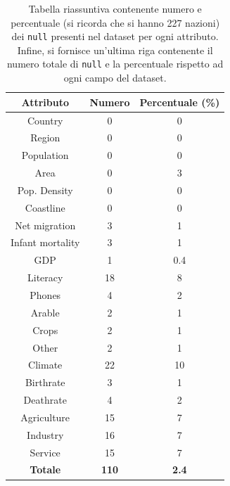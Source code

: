 \begin{table}
	\caption{Tabella riassuntiva contenente numero e percentuale (si ricorda che si hanno 227 nazioni) dei \texttt{null} presenti nel dataset per ogni attributo. Infine, si fornisce un'ultima riga contenente il numero totale di \texttt{null} e la percentuale rispetto ad ogni campo del dataset.}
	
	\label{tab:compl_country}
	
	\centering
	\begin{tabular}{|c|c|c|}
		\hline
		\textbf{Attributo}  & \textbf{Numero} & \textbf{Percentuale (\%)} \\ 
		\hline  
		\rule{0pt}{13pt}Country & 0 & 0 \\ 
		\hline  
		\rule{0pt}{13pt}Region & 0  & 0 \\ 
		\hline  
		\rule{0pt}{13pt}Population & 0 & 0 \\ 
		\hline  
		\rule{0pt}{13pt}Area & 0 & 3 \\ 
		\hline
		\rule{0pt}{13pt}Pop. Density & 0 & 0 \\
		\hline
		\rule{0pt}{13pt}Coastline & 0 & 0 \\
		\hline
		\rule{0pt}{13pt}Net migration & 3 & 1 \\
		\hline
		\rule{0pt}{13pt}Infant mortality & 3 & 1 \\
		\hline
		\rule{0pt}{13pt}GDP & 1 & 0.4 \\
		\hline
		\rule{0pt}{13pt}Literacy & 18 & 8 \\
		\hline
		\rule{0pt}{13pt}Phones & 4 & 2 \\
		\hline
		\rule{0pt}{13pt}Arable & 2 & 1 \\
		\hline
		\rule{0pt}{13pt}Crops & 2 & 1 \\
		\hline
		\rule{0pt}{13pt}Other & 2 & 1 \\
		\hline
		\rule{0pt}{13pt}Climate & 22 & 10 \\
		\hline
		\rule{0pt}{13pt}Birthrate & 3 & 1 \\
		\hline
		\rule{0pt}{13pt}Deathrate & 4 & 2 \\
		\hline
		\rule{0pt}{13pt}Agriculture & 15 & 7 \\
		\hline
		\rule{0pt}{13pt}Industry & 16 & 7 \\
		\hline
		\rule{0pt}{13pt}Service & 15 & 7 \\
		\hline   
		\rule{0pt}{13pt}\textbf{Totale} & \textbf{110} & \textbf{2.4} \\
		\hline
	\end{tabular}
\end{table}

